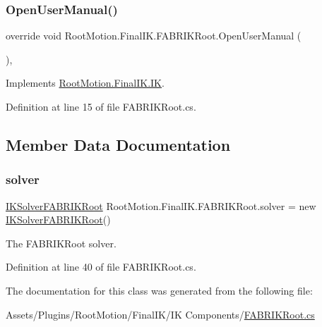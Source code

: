 \subsubsection{\texorpdfstring{Open\+User\+Manual()}{OpenUserManual()}}
{\footnotesize\ttfamily override void Root\+Motion.\+Final\+I\+K.\+F\+A\+B\+R\+I\+K\+Root.\+Open\+User\+Manual (\begin{DoxyParamCaption}{ }\end{DoxyParamCaption})\hspace{0.3cm}{\ttfamily [protected]}, {\ttfamily [virtual]}}



Implements \mbox{\hyperlink{class_root_motion_1_1_final_i_k_1_1_i_k_a1922e31d550e27dcc60eca0d62c699c5}{Root\+Motion.\+Final\+I\+K.\+IK}}.



Definition at line 15 of file F\+A\+B\+R\+I\+K\+Root.\+cs.



\subsection{Member Data Documentation}
\mbox{\label{class_root_motion_1_1_final_i_k_1_1_f_a_b_r_i_k_root_a8206d9a7baeb0a059e7d3232a1b03110}} 
\subsubsection{\texorpdfstring{solver}{solver}}
{\footnotesize\ttfamily \mbox{\hyperlink{class_root_motion_1_1_final_i_k_1_1_i_k_solver_f_a_b_r_i_k_root}{I\+K\+Solver\+F\+A\+B\+R\+I\+K\+Root}} Root\+Motion.\+Final\+I\+K.\+F\+A\+B\+R\+I\+K\+Root.\+solver = new \mbox{\hyperlink{class_root_motion_1_1_final_i_k_1_1_i_k_solver_f_a_b_r_i_k_root}{I\+K\+Solver\+F\+A\+B\+R\+I\+K\+Root}}()}



The F\+A\+B\+R\+I\+K\+Root solver. 



Definition at line 40 of file F\+A\+B\+R\+I\+K\+Root.\+cs.



The documentation for this class was generated from the following file\+:\begin{DoxyCompactItemize}
\item 
Assets/\+Plugins/\+Root\+Motion/\+Final\+I\+K/\+I\+K Components/\mbox{\hyperlink{_f_a_b_r_i_k_root_8cs}{F\+A\+B\+R\+I\+K\+Root.\+cs}}\end{DoxyCompactItemize}
